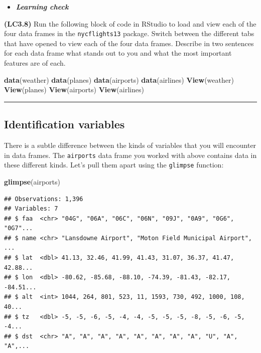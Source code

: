 \documentclass[]{tufte-book}
\newenvironment{Shaded}{\begin{snugshade}}{\end{snugshade}}
\newcommand{\KeywordTok}[1]{\textcolor[rgb]{0.13,0.29,0.53}{\textbf{{#1}}}}
\newcommand{\NormalTok}[1]{{#1}}
\let\oldrule=\rule
\renewcommand{\rule}[1]{\oldrule{\linewidth}}
\newenvironment{rmdblock}[1]
  {\begin{shaded*}
  \begin{itemize}
  \renewcommand{\labelitemi}{
    \raisebox{-.7\height}[0pt][0pt]{
    }
  }
  \item
  }
  {
  \end{itemize}
  \end{shaded*}
  }
\newenvironment{learncheck}
  {\begin{rmdblock}{warning}}
  {\end{rmdblock}}
\begin{document}
\begin{learncheck}
\textbf{\emph{Learning check}}
\end{learncheck}

\textbf{(LC3.8)} Run the following block of code in RStudio to load and
view each of the four data frames in the \texttt{nycflights13} package.
Switch between the different tabs that have opened to view each of the
four data frames. Describe in two sentences for each data frame what
stands out to you and what the most important features are of each.

\begin{Shaded}
\begin{Highlighting}[]
\KeywordTok{data}\NormalTok{(weather)}
\KeywordTok{data}\NormalTok{(planes)}
\KeywordTok{data}\NormalTok{(airports)}
\KeywordTok{data}\NormalTok{(airlines)}
\KeywordTok{View}\NormalTok{(weather)}
\KeywordTok{View}\NormalTok{(planes)}
\KeywordTok{View}\NormalTok{(airports)}
\KeywordTok{View}\NormalTok{(airlines)}
\end{Highlighting}
\end{Shaded}

\begin{center}\rule{0.5\linewidth}{\linethickness}\end{center}

\subsection{Identification variables}\label{identification-variables}

There is a subtle difference between the kinds of variables that you
will encounter in data frames. The \texttt{airports} data frame you
worked with above contains data in these different kinds. Let's pull
them apart using the \texttt{glimpse} function:

\begin{Shaded}
\begin{Highlighting}[]
\KeywordTok{glimpse}\NormalTok{(airports)}
\end{Highlighting}
\end{Shaded}

\begin{verbatim}
## Observations: 1,396
## Variables: 7
## $ faa  <chr> "04G", "06A", "06C", "06N", "09J", "0A9", "0G6", "0G7"...
## $ name <chr> "Lansdowne Airport", "Moton Field Municipal Airport", ...
## $ lat  <dbl> 41.13, 32.46, 41.99, 41.43, 31.07, 36.37, 41.47, 42.88...
## $ lon  <dbl> -80.62, -85.68, -88.10, -74.39, -81.43, -82.17, -84.51...
## $ alt  <int> 1044, 264, 801, 523, 11, 1593, 730, 492, 1000, 108, 40...
## $ tz   <dbl> -5, -5, -6, -5, -4, -4, -5, -5, -5, -8, -5, -6, -5, -4...
## $ dst  <chr> "A", "A", "A", "A", "A", "A", "A", "A", "U", "A", "A",...
\end{verbatim}
\end{document}
